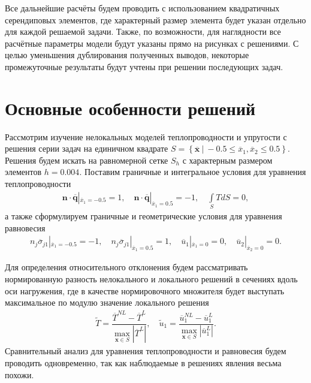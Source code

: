 Все дальнейшие расчёты будем проводить с использованием квадратичных серендиповых элементов, где характерный размер элемента будет указан отдельно для каждой решаемой задачи. Также, по возможности, для наглядности все расчётные параметры модели будут указаны прямо на рисунках с решениями. С целью уменьшения дублирования полученных выводов, некоторые промежуточные результаты будут учтены при решении последующих задач.

\section{Основные особенности решений}\label{sec:ResultsAnalysis/KeyFeatures}

Рассмотрим изучение нелокальных моделей теплопроводности и упругости с решения серии задач на единичном квадрате $S = \left\{ \overline{\boldsymbol{x}} \ | \ -0.5 \leqslant \overline{x}_1, \overline{x}_2 \leqslant 0.5 \right\}$. Решения будем искать на равномерной сетке $S_h$ с характерным размером элементов $h = 0.004$. Поставим граничные и интегральное условия для уравнения теплопроводности
\begin{gather*}
	\boldsymbol{n} \cdot \overline{\boldsymbol{q}} |_{\overline{x}_1 = -0.5} = 1,
	\quad
	\boldsymbol{n} \cdot \overline{\boldsymbol{q}} |_{\overline{x}_1 = 0.5} = -1,
	\quad
	\int\limits_S T dS = 0,
\end{gather*}
а также сформулируем граничные и геометрические условия для уравнения равновесия
\begin{gather*}
	n_j \overline{\sigma}_{j1} |_{\overline{x}_1 = -0.5} = -1,
	\quad
	n_j \overline{\sigma}_{j1} |_{\overline{x}_1 = 0.5} = 1,
	\quad
	\overline{u}_1 |_{\overline{x}_1 = 0} = 0,
	\quad
	\overline{u}_2 |_{\overline{x}_2 = 0} = 0.
\end{gather*}

Для определения относительного отклонения будем рассматривать нормированную разность нелокального и локального решений в сечениях вдоль оси нагружения, где в качестве нормировочного множителя будет выступать максимальное по модулю значение локального решения
\begin{gather*}
	\widetilde{T} = \dfrac{\overline{T}^{NL} - \overline{T}^L}{\max\limits_{\boldsymbol{x} \in S} \left| \overline{T}^L \right|},
	\quad
	\widetilde{u}_1 = \dfrac{\overline{u}^{NL}_1 - \overline{u}^L_1}{\max\limits_{\boldsymbol{x} \in S} \left| \overline{u}^L_1 \right|}.
\end{gather*}
Сравнительный анализ для уравнения теплопроводности и равновесия будем проводить одновременно, так как наблюдаемые в решениях явления весьма похожи.


